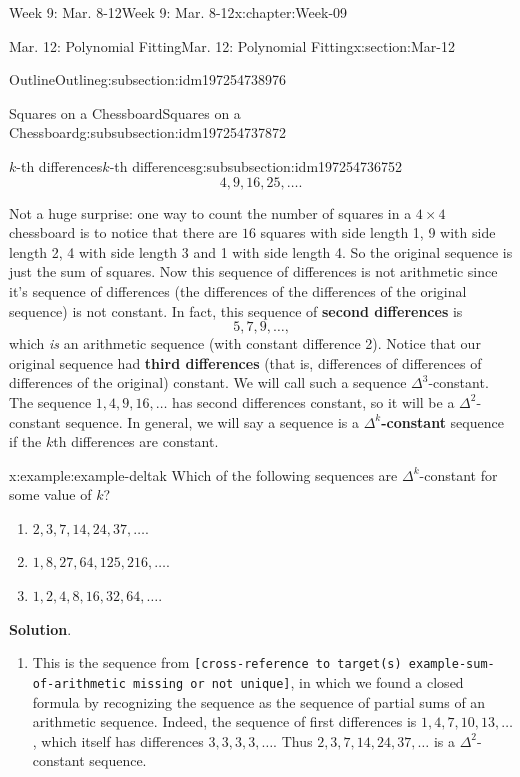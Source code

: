 \documentclass[oneside,10pt,]{book}
\newcommand{\blocktitlefont}{\relax}
\newcommand{\mono}[1]{\texttt{#1}}
\newcommand{\terminology}[1]{\textbf{#1}}
\numberwithin{equation}{section}
\begin{document}
\begin{chapterptx}{Week 9: Mar. 8-12}{}{Week 9: Mar. 8-12}{}{}{x:chapter:Week-09}
\begin{sectionptx}{Mar. 12: Polynomial Fitting}{}{Mar. 12: Polynomial Fitting}{}{}{x:section:Mar-12}
\begin{subsectionptx}{Outline}{}{Outline}{}{}{g:subsection:idm197254738976}
\begin{subsubsectionptx}{Squares on a Chessboard}{}{Squares on a Chessboard}{}{}{g:subsubsection:idm197254737872}
\begin{subsubsectionptx}{\(k\)-th differences}{}{\(k\)-th differences}{}{}{g:subsubsection:idm197254736752}
\begin{equation*}
4, 9, 16, 25, \ldots\text{.}
\end{equation*}
%
\par
Not a huge surprise: one way to count the number of squares in a \(4 \times 4\) chessboard is to notice that there are \(16\) squares with side length 1, 9 with side length 2, 4 with side length 3 and 1 with side length 4. So the original sequence is just the sum of squares. Now this sequence of differences is not arithmetic since it's sequence of differences (the differences of the differences of the original sequence) is not constant. In fact, this sequence of \terminology{second differences} is %
\begin{equation*}
5, 7, 9, \ldots\text{,}
\end{equation*}
which \emph{is} an arithmetic sequence (with constant difference 2). Notice that our original sequence had \terminology{third differences} (that is, differences of differences of differences of the original) constant. We will call such a sequence \(\Delta^3\)-constant. The sequence \(1, 4, 9, 16, \ldots\) has second differences constant, so it will be a \(\Delta^2\)-constant sequence. In general, we will say a sequence is a \terminology{\(\Delta^k\)-constant} \label{g:notation:idm197254718688} sequence if the \(k\)th differences are constant.%
\begin{example}{}{x:example:example-deltak}%
Which of the following sequences are \(\Delta^k\)-constant for some value of \(k\)?%
\begin{enumerate}
\item{}\(2, 3, 7, 14, 24, 37,\ldots\).%
\item{}\(1, 8, 27, 64, 125, 216, \ldots\).%
\item{}\(1,2,4,8,16,32,64,\ldots\).%
\end{enumerate}
%
\par\smallskip%
\noindent\textbf{\blocktitlefont Solution}.\hypertarget{p:solution:vrl}{}\quad{}%
\begin{enumerate}
\item{}This is the sequence from \mono{[cross-reference to target(s) \textquotedbl{}example-sum-of-arithmetic\textquotedbl{} missing or not unique]}, in which we found a closed formula by recognizing the sequence as the sequence of partial sums of an arithmetic sequence. Indeed, the sequence of first differences is \(1,4,7, 10, 13,\ldots\), which itself has differences \(3,3,3,3,\ldots\). Thus \(2, 3, 7, 14, 24, 37,\ldots\) is a \(\Delta^2\)-constant sequence.%

\end{enumerate}
\end{example}
\end{subsubsectionptx}
\end{subsubsectionptx}
\end{subsectionptx}
\end{sectionptx}
\end{chapterptx}
\end{document}
